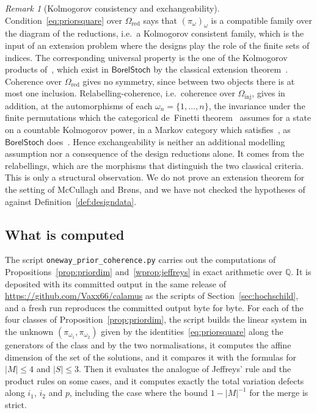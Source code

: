 \documentclass[11pt,a4paper]{article}
\theoremstyle{plain}
\theoremstyle{definition}
\theoremstyle{remark}
\newtheorem{remark}[theorem]{Remark}
\newcommand{\cat}[1]{\mathsf{#1}}
\newcommand{\catO}{\cat{\Omega}}
\newcommand{\BorelStoch}{\cat{BorelStoch}}
\begin{document}
\begin{remark}[Kolmogorov consistency and exchangeability]\label{rem:definetti}
Condition~\eqref{eq:priorsquare} over $\catO_{\mathrm{red}}$ says that
$(\pi_{\omega})_{\omega}$ is a compatible family over the diagram of the
reductions, i.e.\ a Kolmogorov consistent family, which is the input of an
extension problem where the designs play the role of the finite sets of
indices. The corresponding universal property is the one of the Kolmogorov
products of~\cite[Def.~3.1, Def.~4.1]{fritz_rischel_infinite_2020}, which
exist in $\BorelStoch$ by the classical extension
theorem~\cite[Ex.~3.6]{fritz_rischel_infinite_2020}. Coherence over
$\catO_{\mathrm{red}}$ gives no symmetry, since between two objects there is
at most one inclusion. Relabelling-coherence, i.e.\ coherence over
$\catO_{\mathrm{inj}}$, gives in addition, at the automorphisms of each
$\omega_n = \{1,\dots,n\}$, the invariance under the finite permutations which
the categorical de~Finetti
theorem~\cite[Thm.~4.4]{fritz_definetti_2021} assumes for a state on a
countable Kolmogorov power, in a Markov category which
satisfies~\cite[Assumption~4.2]{fritz_definetti_2021}, as $\BorelStoch$
does~\cite[Ex.~4.3]{fritz_definetti_2021}. Hence exchangeability is neither an
additional modelling assumption nor a consequence of the design reductions
alone. It comes from the relabellings, which are the morphisms that
distinguish the two classical criteria. This is only a structural observation.
We do not prove an extension theorem for the setting of McCullagh and Br\o ns,
and we have not checked the hypotheses
of~\cite{fritz_rischel_infinite_2020,fritz_definetti_2021} against
Definition~\ref{def:designdata}.
\end{remark}

\subsection*{What is computed}

The script \texttt{oneway\_\allowbreak prior\_\allowbreak coherence.py}
carries out the computations of Propositions~\ref{prop:priordim}
and~\ref{wprop:jeffreys} in exact arithmetic over $\mathbb{Q}$. It is
deposited with its committed output in the same release of
\url{https://github.com/Vaxx66/calamus} as the scripts of
Section~\ref{sec:hochschild}, and a fresh run reproduces the committed output
byte for byte. For each of the four classes of
Proposition~\ref{prop:priordim}, the script builds the linear system in the
unknown $(\pi_{\omega_1},\pi_{\omega_2})$ given by the
identities~\eqref{eq:priorsquare} along the generators of the class and by the
two normalisations, it computes the affine dimension of the set of the
solutions, and it compares it with the formulas for $|M| \le 4$ and
$|S| \le 3$. Then it evaluates the analogue of Jeffreys' rule and the product
rules on some cases, and it computes exactly the total variation defects along
$i_{1}$, $i_{2}$ and $p$, including the case where the bound $1-|M|^{-1}$ for
the merge is strict.
\end{document}
